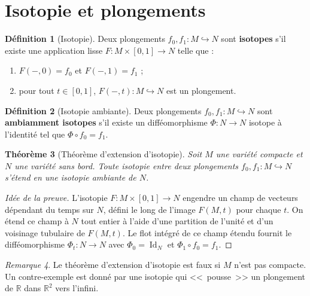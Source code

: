 \documentclass[12pt,a4paper,openany]{book}
\theoremstyle{definition}
\newtheorem{definition}{Définition}[chapter]
\theoremstyle{plain}
\newtheorem{theoreme}[definition]{Théorème}
\theoremstyle{remark}
\newtheorem{remarque}[definition]{Remarque}
\newcommand{\R}{\mathbb{R}}
\DeclareMathOperator{\Id}{Id}
\begin{document}
\section{Isotopie et plongements}\label{sec:isotopie}

\begin{definition}[Isotopie]\label{def:isotopie}
Deux plongements $f_0, f_1 : M \hookrightarrow N$ sont \textbf{isotopes} s'il
existe une application lisse $F : M \times [0,1] \to N$ telle que :
\begin{enumerate}[label=(\roman*)]
  \item $F(-, 0) = f_0$ et $F(-, 1) = f_1$ ;
  \item pour tout $t \in [0,1]$, $F(-, t) : M \hookrightarrow N$ est un plongement.
\end{enumerate}
\end{definition}

\begin{definition}[Isotopie ambiante]\label{def:isotopie-ambiante}
Deux plongements $f_0, f_1 : M \hookrightarrow N$ sont \textbf{ambiamment
isotopes} s'il existe un difféomorphisme $\Phi : N \to N$ isotope à l'identité
tel que $\Phi \circ f_0 = f_1$.
\end{definition}

\begin{theoreme}[Théorème d'extension d'isotopie]\label{thm:extension-isotopie}
Soit $M$ une variété compacte et $N$ une variété sans bord. Toute isotopie entre
deux plongements $f_0, f_1 : M \hookrightarrow N$ s'étend en une isotopie
ambiante de $N$.
\end{theoreme}

\begin{proof}[Idée de la preuve]
L'isotopie $F : M \times [0,1] \to N$ engendre un champ de vecteurs dépendant
du temps sur $N$, défini le long de l'image $F(M, t)$ pour chaque $t$. On
étend ce champ à $N$ tout entier à l'aide d'une partition de l'unité et d'un
voisinage tubulaire de $F(M, t)$. Le flot intégré de ce champ étendu fournit
le difféomorphisme $\Phi_t : N \to N$ avec $\Phi_0 = \Id_N$ et
$\Phi_1 \circ f_0 = f_1$.
\end{proof}

\begin{remarque}
Le théorème d'extension d'isotopie est faux si $M$ n'est pas compacte. Un
contre-exemple est donné par une isotopie qui <<~pousse~>> un plongement de $\R$
dans $\R^2$ vers l'infini.
\end{remarque}
\end{document}
